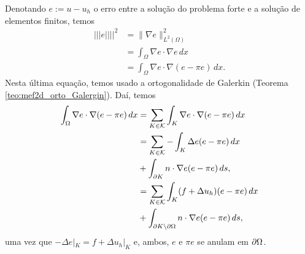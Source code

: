 \begin{dem}
  Denotando $e := u - u_h$ o erro entre a solução do problema forte e a solução de elementos finitos, temos
  \begin{align}
    |||e||||^2 &= \|\nabla e\|_{L^2(\Omega)}^2 \\
               &= \int_\Omega \nabla e \cdot \nabla e\,dx\\
               &= \int_\Omega \nabla e \cdot \nabla (e - \pi e)\,dx.
  \end{align}
Nesta última equação, temos usado a ortogonalidade de Galerkin (Teorema \ref{teo:mef2d_orto_Galergin}). Daí, temos
\begin{align}
  \int_\Omega \nabla e \cdot \nabla (e - \pi e)\,dx &= \sum_{K\in\mathcal{K}} \int_K \nabla e \cdot \nabla (e - \pi e)\,dx\\
  &= \sum_{K\in\mathcal{K}} -\int_K\Delta e (e-\pi e)\,dx \nonumber\\
  &+ \int_{\partial K} n\cdot \nabla e(e-\pi e)\,ds,\\
  &= \sum_{K\in\mathcal{K}} \int_K (f + \Delta u_h)(e-\pi e)\,dx \nonumber\\
  &+ \int_{\partial K\setminus\partial\Omega} n\cdot\nabla e(e-\pi e)\,ds,\label{eq:aux_pos}
\end{align}
uma vez que $-\Delta e|_{K} = f + \Delta u_h|_{K}$ e, ambos, $e$ e $\pi e$ se anulam em $\partial \Omega$.


\end{dem}
